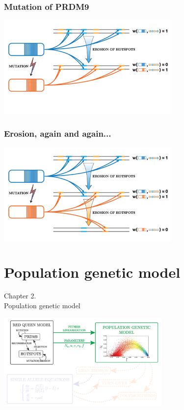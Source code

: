 \documentclass[10pt]{beamer}
\begin{document}
\begin{frame}
\frametitle{Mutation of PRDM9}
	\begin{center}
       \includegraphics[width=9cm]{Images/RedQueen-4.png}
	\end{center}
\end{frame}

\begin{frame}
\frametitle{Erosion, again and again...}
	\begin{center}
       \includegraphics[width=9cm]{Images/RedQueen-5.png}
	\end{center}
\end{frame}


\section{Population genetic model}

\begin{frame}
	\begin{center}
	\huge
	Chapter 2. \\
       Population genetic model
	\end{center}
\end{frame}

\begin{frame}
	\begin{center}
       \includegraphics[width=8.5cm]{Images/overline-2.png}
	\end{center}
\end{frame}
\end{document}
